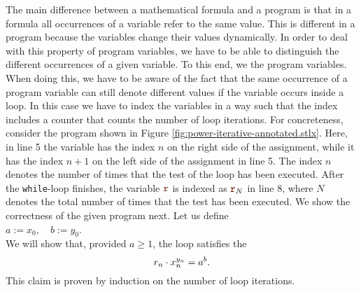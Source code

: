 The main difference between a mathematical formula and a program is that in a formula all
occurrences of a variable refer to the same value.   This is different in a program because the
variables change their values dynamically.  In order to deal with this property of program variables,
we have to be able to distinguish the different occurrences of a given variable.  To this end,  we 
 the program variables. 
When doing this, we have to be aware of the fact that the same occurrence of a program variable can
still denote different values if the variable occurs inside  a loop.  In this case we have to index
the variables in a way such that the index includes a counter that counts the number of loop iterations.
For concreteness, consider the  program shown in 
Figure \ref{fig:power-iterative-annotated.stlx}.  
Here, in line 5 the variable  has the index $n$ on the right side of the assignment,
while it has the index $n+1$ on the left side of the assignment in line 5.  The index $n$ denotes 
the number of times that the test  of the  loop has been executed.
After the \texttt{while}-loop finishes, the variable $\mytt{r}$ is indexed as
$\mytt{r}_N$ in line 8, where $N$ denotes the total number of times that the test  has been executed.
We show the correctness of the given program next.  Let us define
\\[0.2cm]
\hspace*{1.3cm}
$ a := x_0, \quad b := y_0$.
\\[0.2cm]
We will show that, provided $a \geq 1$, the  loop satisfies the 
\begin{equation}
  \label{eq:powerInv}
  \displaystyle r_n \cdot x_n^{y_n} = a^b.
\end{equation}
This claim is proven by induction on the number of loop iterations.
